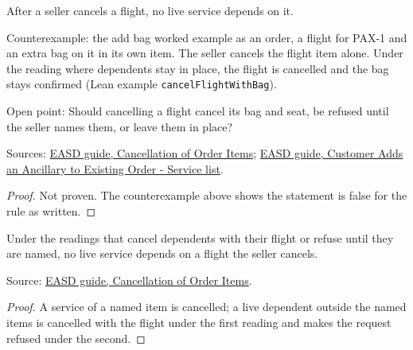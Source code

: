 \begin{theorem}
  \label{thm:ancillaries-cancel-no-live-dependents}
  After a seller cancels a flight, no live service depends on it.

  Counterexample: the add bag worked example as an order, a flight for PAX-1
  and an extra bag on it in its own item.  The seller cancels the flight
  item alone.  Under the reading where dependents stay in place, the flight
  is cancelled and the bag stays confirmed (Lean example
  \texttt{cancelFlightWithBag}).

  Open point: Should cancelling a flight cancel its bag and seat, be
  refused until the seller names them, or leave them in place?

  Sources: \href{https://standards.atlassian.net/wiki/spaces/EASD/pages/574783569}{EASD guide, Cancellation of Order Items};
  \href{https://standards.atlassian.net/wiki/spaces/EASD/pages/842301531}{EASD guide, Customer Adds an Ancillary to Existing Order - Service list}.
\end{theorem}
\begin{proof}
  Not proven.  The counterexample above shows the statement is false for the
  rule as written.
\end{proof}

\begin{theorem}
  \label{thm:ancillaries-cancel-no-live-dependents-of-not-leave}
  Under the readings that cancel dependents with their flight or refuse
  until they are named, no live service depends on a flight the seller
  cancels.

  Source: \href{https://standards.atlassian.net/wiki/spaces/EASD/pages/574783569}{EASD guide, Cancellation of Order Items}.
\end{theorem}
\begin{proof}
  A service of a named item is cancelled; a live dependent outside the named
  items is cancelled with the flight under the first reading and makes the
  request refused under the second.
\end{proof}

